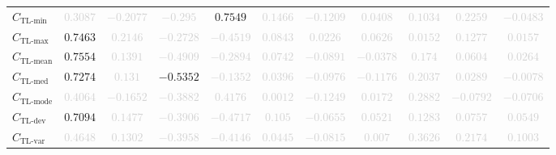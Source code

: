 \documentclass{standalone}
\newcommand{\tlminname}{\text{TL-min}}
\newcommand{\tlmin}{C_{\tlminname}}
\newcommand{\tlavgname}{\text{TL-mean}}
\newcommand{\tlavg}{C_{\tlavgname}}
\newcommand{\tlmaxname}{\text{TL-max}}
\newcommand{\tlmax}{C_{\tlmaxname}}
\newcommand{\tlmedname}{\text{TL-med}}
\newcommand{\tlmed}{C_{\tlmedname}}
\newcommand{\tlmodename}{\text{TL-mode}}
\newcommand{\tlmode}{C_{\tlmodename}}
\newcommand{\tldevname}{\text{TL-dev}}
\newcommand{\tldev}{C_{\tldevname}}
\newcommand{\tlvarname}{\text{TL-var}}
\newcommand{\tlvar}{C_{\tlvarname}}
\begin{document}
\begin{tabular}{lcccccccccc}
$\tlmin$ & \textcolor{lightgray}{$0.3087$} & \textcolor{lightgray}{$-0.2077$} & \textcolor{lightgray}{$-0.295$} & $0.7549$ & \textcolor{lightgray}{$0.1466$} & \textcolor{lightgray}{$-0.1209$} & \textcolor{lightgray}{$0.0408$} & \textcolor{lightgray}{$0.1034$} & \textcolor{lightgray}{$0.2259$} & \textcolor{lightgray}{$-0.0483$} \\ 
$\tlmax$ & $0.7463$ & \textcolor{lightgray}{$0.2146$} & \textcolor{lightgray}{$-0.2728$} & \textcolor{lightgray}{$-0.4519$} & \textcolor{lightgray}{$0.0843$} & \textcolor{lightgray}{$0.0226$} & \textcolor{lightgray}{$0.0626$} & \textcolor{lightgray}{$0.0152$} & \textcolor{lightgray}{$0.1277$} & \textcolor{lightgray}{$0.0157$} \\ 
$\tlavg$ & $0.7554$ & \textcolor{lightgray}{$0.1391$} & \textcolor{lightgray}{$-0.4909$} & \textcolor{lightgray}{$-0.2894$} & \textcolor{lightgray}{$0.0742$} & \textcolor{lightgray}{$-0.0891$} & \textcolor{lightgray}{$-0.0378$} & \textcolor{lightgray}{$0.174$} & \textcolor{lightgray}{$0.0604$} & \textcolor{lightgray}{$0.0264$} \\ 
$\tlmed$ & $0.7274$ & \textcolor{lightgray}{$0.131$} & $-0.5352$ & \textcolor{lightgray}{$-0.1352$} & \textcolor{lightgray}{$0.0396$} & \textcolor{lightgray}{$-0.0976$} & \textcolor{lightgray}{$-0.1176$} & \textcolor{lightgray}{$0.2037$} & \textcolor{lightgray}{$0.0289$} & \textcolor{lightgray}{$-0.0078$} \\ 
$\tlmode$ & \textcolor{lightgray}{$0.4064$} & \textcolor{lightgray}{$-0.1652$} & \textcolor{lightgray}{$-0.3882$} & \textcolor{lightgray}{$0.4176$} & \textcolor{lightgray}{$0.0012$} & \textcolor{lightgray}{$-0.1249$} & \textcolor{lightgray}{$0.0172$} & \textcolor{lightgray}{$0.2882$} & \textcolor{lightgray}{$-0.0792$} & \textcolor{lightgray}{$-0.0706$} \\ 
$\tldev$ & $0.7094$ & \textcolor{lightgray}{$0.1477$} & \textcolor{lightgray}{$-0.3906$} & \textcolor{lightgray}{$-0.4717$} & \textcolor{lightgray}{$0.105$} & \textcolor{lightgray}{$-0.0655$} & \textcolor{lightgray}{$0.0521$} & \textcolor{lightgray}{$0.1283$} & \textcolor{lightgray}{$0.0757$} & \textcolor{lightgray}{$0.0549$} \\ 
$\tlvar$ & \textcolor{lightgray}{$0.4648$} & \textcolor{lightgray}{$0.1302$} & \textcolor{lightgray}{$-0.3958$} & \textcolor{lightgray}{$-0.4146$} & \textcolor{lightgray}{$0.0445$} & \textcolor{lightgray}{$-0.0815$} & \textcolor{lightgray}{$0.007$} & \textcolor{lightgray}{$0.3626$} & \textcolor{lightgray}{$0.2174$} & \textcolor{lightgray}{$0.1003$} \\ 

\end{tabular}
\end{document}
